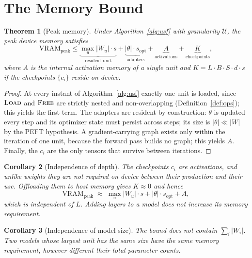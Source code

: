 \documentclass[preprint,12pt]{elsarticle}
\newtheorem{theorem}{Theorem}
\newtheorem{corollary}[theorem]{Corollary}
\newcommand{\Wu}{\lvert W_u \rvert}
\begin{document}
\section{The Memory Bound}
\label{sec:vram}

\begin{theorem}[Peak memory]
\label{thm:vram}
Under Algorithm~\ref{alg:usf} with granularity $\mathcal{U}$, the peak device memory satisfies
\begin{equation}
\label{eq:vram}
\mathrm{VRAM}_{\text{peak}} \le \underbrace{\max_u \Wu \cdot s}_{\text{resident unit}}
+ \underbrace{|\theta|\cdot s_{\text{opt}}}_{\text{adapters}}
+ \underbrace{A}_{\text{activations}}
+ \underbrace{K}_{\text{checkpoints}},
\end{equation}
where $A$ is the internal activation memory of a \emph{single} unit and
$K = L\cdot B\cdot S\cdot d\cdot s$ if the checkpoints $\{c_i\}$ reside on device.
\end{theorem}

\begin{proof}
At every instant of Algorithm~\ref{alg:usf} exactly one unit is loaded, since $\textsc{Load}$ and
$\textsc{Free}$ are strictly nested and non-overlapping (Definition~\ref{def:ops}); this yields the first
term. The adapters are resident by construction: $\theta$ is updated every step and its optimizer
state must persist across steps; its size is $|\theta| \ll |W|$ by the PEFT hypothesis. A
gradient-carrying graph exists only within the iteration of one unit, because the forward pass
builds no graph; this yields $A$. Finally, the $c_i$ are the only tensors that survive between
iterations.
\end{proof}

\begin{corollary}[Independence of depth]
\label{cor:depth}
The checkpoints $c_i$ are activations, and unlike weights they are not required on device between
their production and their use. Offloading them to host memory gives $K \approx 0$ and hence
\begin{equation}
\mathrm{VRAM}_{\text{peak}} \;\approx\; \max_u \Wu \cdot s + |\theta| \cdot s_{\text{opt}} + A ,
\end{equation}
which is independent of $L$. Adding layers to a model does not increase its memory requirement.
\end{corollary}

\begin{corollary}[Independence of model size]
\label{cor:size}
The bound does not contain $\sum_i |W_i|$. Two models whose largest unit has the same size have
the same memory requirement, however different their total parameter counts.
\end{corollary}
\end{document}
